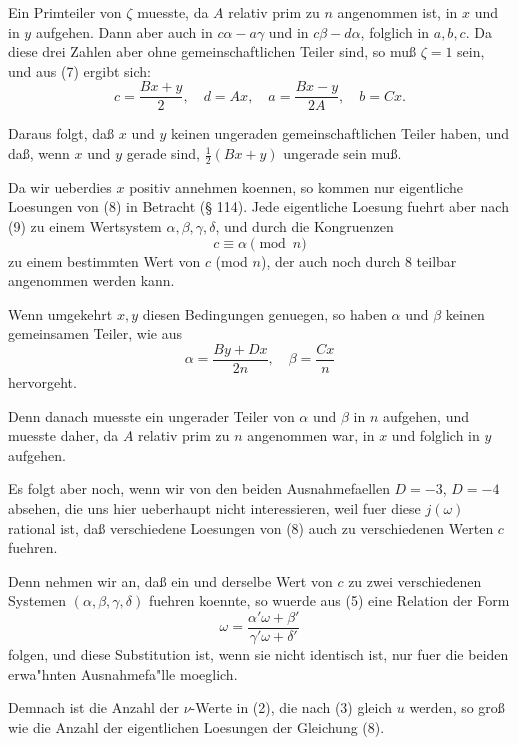 \documentclass[12pt,a4paper]{article}
\theoremstyle{plain}
\theoremstyle{definition}
\theoremstyle{remark}
\begin{document}
Ein Primteiler von $\zeta$ muesste, da $A$ relativ prim zu $n$ angenommen ist, in $x$ und in $y$ aufgehen. Dann aber auch in $c\alpha - a\gamma$ und in $c\beta - d\alpha$, folglich in $a, b, c$. Da diese drei Zahlen aber ohne gemeinschaftlichen Teiler sind, so mu\ss{} $\zeta = 1$ sein, und aus (7) ergibt sich:
\begin{equation}\label{eq:136_9}
c = \frac{Bx + y}{2}, \quad d = Ax, \quad a = \frac{Bx - y}{2A}, \quad b = Cx.
\end{equation}

Daraus folgt, da\ss{} $x$ und $y$ keinen ungeraden gemeinschaftlichen Teiler haben, und da\ss{}, wenn $x$ und $y$ gerade sind, $\frac{1}{2}(Bx + y)$ ungerade sein mu\ss{}.

Da wir ueberdies $x$ positiv annehmen koennen, so kommen nur eigentliche Loesungen von (8) in Betracht (\S{} 114). Jede eigentliche Loesung fuehrt aber nach (9) zu einem Wertsystem $\alpha, \beta, \gamma, \delta$, und durch die Kongruenzen
\begin{equation}\label{eq:136_10}
c \equiv \alpha \pmod{n}
\end{equation}
zu einem bestimmten Wert von $c$ (mod $n$), der auch noch durch 8 teilbar angenommen werden kann.

Wenn umgekehrt $x, y$ diesen Bedingungen genuegen, so haben $\alpha$ und $\beta$ keinen gemeinsamen Teiler, wie aus
\[
\alpha = \frac{By + Dx}{2n}, \quad \beta = \frac{Cx}{n}
\]
hervorgeht.

Denn danach muesste ein ungerader Teiler von $\alpha$ und $\beta$ in $n$ aufgehen, und muesste daher, da $A$ relativ prim zu $n$ angenommen war, in $x$ und folglich in $y$ aufgehen.

Es folgt aber noch, wenn wir von den beiden Ausnahmefaellen $D = -3$, $D = -4$ absehen, die uns hier ueberhaupt nicht interessieren, weil fuer diese $j(\omega)$ rational ist, da\ss{} verschiedene Loesungen von (8) auch zu verschiedenen Werten $c$ fuehren.

Denn nehmen wir an, da\ss{} ein und derselbe Wert von $c$ zu zwei verschiedenen Systemen $(\alpha, \beta, \gamma, \delta)$ fuehren koennte, so wuerde aus (5) eine Relation der Form
\[
\omega = \frac{\alpha'\omega + \beta'}{\gamma'\omega + \delta'}
\]
folgen, und diese Substitution ist, wenn sie nicht identisch ist, nur fuer die beiden erwa"hnten Ausnahmefa"lle moeglich.

Demnach ist die Anzahl der $\nu$-Werte in (2), die nach (3) gleich $u$ werden, so gro\ss{} wie die Anzahl der eigentlichen Loesungen der Gleichung (8).
\end{document}

